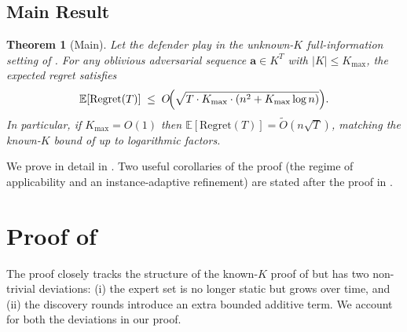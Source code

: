 \documentclass[letterpaper,9pt,twocolumn]{extarticle}
\newcommand{\avec}{\mathbf{a}}
\newcommand{\EE}{\mathbb{E}}
\newcommand{\Kmax}{K_{\max}}
\newcommand{\Regret}{\mathrm{Regret}}
\theoremstyle{plain}
\newtheorem{theorem}{Theorem}
\theoremstyle{definition}
\theoremstyle{remark}
\begin{document}
\subsection{Main Result}
\label{sec:mainresult}

\begin{theorem}[Main]
\label{thm:main}
Let the defender play  in the unknown-$K$ full-information
setting of . For any oblivious adversarial sequence
$\avec\in K^T$ with $|K|\le\Kmax$, the expected regret satisfies
\begin{equation}
\EE[\Regret(T)]\;\le\;O\!\Bigl(\sqrt{T\cdot\Kmax\cdot(n^2+\Kmax\log n)}\Bigr).
\label{eq:main}
\end{equation}
In particular, if $\Kmax=O(1)$ then $\EE[\Regret(T)]=\tilde O(n\sqrt T)$,
matching the known-$K$ bound of \citet[Theorem 5.1]{balcan2015} up to
logarithmic factors.
\end{theorem}

We prove  in detail in . Two useful
corollaries of the proof (the regime of applicability and an
instance-adaptive refinement) are stated after the proof in
.

\section{Proof of }
\label{sec:proof}

The proof closely tracks the structure of the known-$K$ proof of \citet[Sec.~5]{balcan2015}
but has two non-trivial deviations: (i) the expert set is no longer static
but grows over time, and (ii) the discovery rounds introduce an extra
bounded additive term. We account for both the deviations in our proof.
\end{document}
